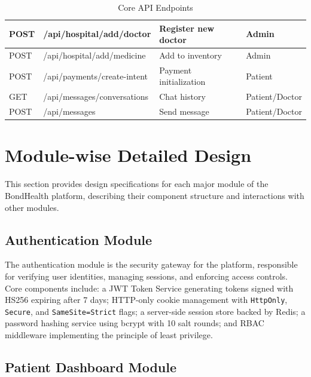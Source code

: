 \begin{table}[H]
\begin{tabular}{|>{\raggedright\arraybackslash}p{1.6cm}|>{\raggedright\arraybackslash}p{5.1cm}|>{\raggedright\arraybackslash}p{4.2cm}|>{\raggedright\arraybackslash}p{2.9cm}|}
        POST & /api/hospital/\allowbreak add/doctor & Register new doctor & Admin \\
        \hline
        POST & /api/hospital/\allowbreak add/medicine & Add to inventory & Admin \\
        \hline
        POST & /api/payments/\allowbreak create-intent & Payment initialization & Patient \\
        \hline
        GET  & /api/messages/\allowbreak conversations & Chat history & Patient/\allowbreak{}Doctor \\
        \hline
        POST & /api/messages & Send message & Patient/\allowbreak{}Doctor \\
        \hline
    \end{tabular}
    \caption{Core API Endpoints}
    \label{tab:api-endpoints}
\end{table}


\section{Module-wise Detailed Design}

\justifying
This section provides design specifications for each major module of the BondHealth platform,
describing their component structure and interactions with other modules.

\subsection{Authentication Module}

\justifying
The authentication module is the security gateway for the platform, responsible for verifying
user identities, managing sessions, and enforcing access controls. Core components include:
a JWT Token Service generating tokens signed with HS256 expiring after 7 days; HTTP-only
cookie management with \texttt{HttpOnly}, \texttt{Secure}, and \texttt{SameSite=Strict} flags;
a server-side session store backed by Redis; a password hashing service using bcrypt with 10
salt rounds; and RBAC middleware implementing the principle of least privilege.

\subsection{Patient Dashboard Module}

